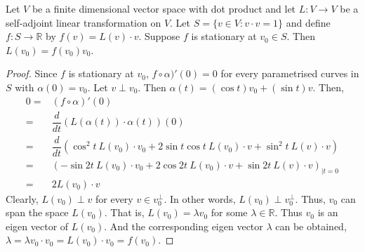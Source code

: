 \begin{lemma}
	Let $V$ be a finite dimensional vector space with dot product and let $L : V \to V$ be a self-adjoint linear transformation on $V$. Let $S = \{ v \in V : v\cdot v = 1\}$ and define $f : S \to \mathbb{R}$ by $f(v) = L(v) \cdot v$. Suppose $f$ is stationary at $v_0 \in S$. Then $L(v_0) = f(v_0)v_0$.
\end{lemma}
\begin{proof}
	Since $f$ is stationary at $v_0$, $f \circ \alpha)'(0) = 0$ for every parametrised curves in $S$ with $\alpha(0) = v_0$. Let $v \perp v_0$. Then $\alpha(t) = (\cos t)v_0 + (\sin t)v$. Then,
	\begin{align*}
		0 = & (f \circ \alpha)'(0)\\
		= & \dfrac{d}{dt} \left( L(\alpha(t)) \cdot \alpha(t)  \right)(0)\\
		= & \dfrac{d}{dt} \left( \cos^2 t\ L(v_0) \cdot v_0 + 2\sin t \cos t\ L(v_0) \cdot v + \sin^2 t\ L(v) \cdot v \right)\\
		= & \left(-\sin 2t\ L(v_0) \cdot v_0 + 2\cos 2t\ L(v_0) \cdot v + \sin 2t\ L(v) \cdot v\right)_{|t = 0} \\
		= & 2L(v_0) \cdot v
	\end{align*}
	Clearly, $L(v_0) \perp v$ for every $v \in v_0^\perp$. In other words, $L(v_0) \perp v_0^\perp$. Thus, $v_0$ can span the space $L(v_0)$. That is, $L(v_0) = \lambda v_0$ for some $\lambda \in \mathbb{R}$. Thus $v_0$ is an eigen vector of $L(v_0)$. And the corresponding eigen vector $\lambda$ can be obtained, $ \lambda = \lambda v_0 \cdot v_0 = L(v_0) \cdot v_0 = f(v_0)$.
\end{proof}


